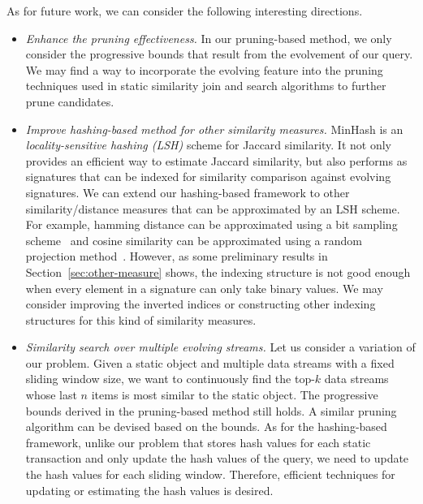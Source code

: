 As for future work, we can consider the following interesting directions.  

\begin{itemize}
   
\item \textit{Enhance the pruning effectiveness.} In our pruning-based method, we only consider the progressive bounds that result from the evolvement of our query. We may find a way to incorporate the evolving feature into the pruning techniques used in static similarity join and search algorithms to further prune candidates.    

  
\item \textit{Improve hashing-based method for other similarity measures.} MinHash is an \emph{locality-sensitive hashing (LSH)} scheme for Jaccard similarity. It not only provides an efficient way to estimate Jaccard similarity, but also performs as signatures that can be indexed for similarity comparison against evolving signatures. We can extend our hashing-based framework to other similarity/distance measures that can be approximated by an LSH scheme. For example, hamming distance can be approximated using a bit sampling scheme~\cite{IndykM98} and cosine similarity can be approximated using a random projection method~\cite{C02}. However, as some preliminary results in Section~\ref{sec:other-measure} shows, the indexing structure is not good enough when every element in a signature can only take binary values. We may consider improving the inverted indices or constructing other indexing structures for this kind of similarity measures.  
                                 

\item \textit{Similarity search over multiple evolving streams.} Let us consider a variation of our problem. Given a static object and multiple data streams with a fixed sliding window size, we want to continuously find the top-$k$ data streams whose last $n$ items is most similar to the static object. The progressive bounds derived in the pruning-based method still holds. A similar pruning algorithm can be devised based on the bounds. As for the hashing-based framework, unlike our problem that stores hash values for each static transaction and only update the hash values of the query, we need to update the hash values for each sliding window. Therefore, efficient techniques for updating or estimating the hash values is desired.        


\end{itemize}














